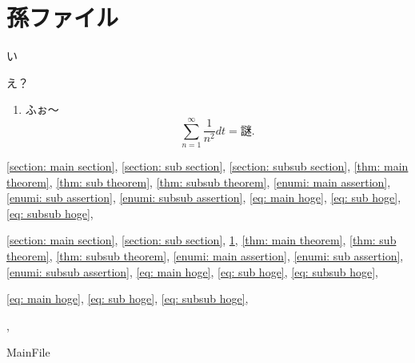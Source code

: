 \documentclass[uplatex,dvipdfmx]{jsarticle}
\begin{document}
\fi\fi

\section{孫ファイル}\label{section: subsub section}
い
\begin{thm}\label{thm: subsub theorem}
  え？
  \begin{enumerate}
    \item \label{enumi: subsub assertion}
    ふぉ〜
    \begin{equation}
      \label{eq: subsub hoge}
      \sum_{n=1}^{\infty}\frac{1}{n^2}dt = \text{謎}.
      \tag{\(\spadesuit\)}
    \end{equation}
  \end{enumerate}
\end{thm}

\autoref{section: main section},
\autoref{section: sub section},
\autoref{section: subsub section},
\autoref{thm: main theorem},
\autoref{thm: sub theorem},
\autoref{thm: subsub theorem},
\autoref{enumi: main assertion},
\autoref{enumi: sub assertion},
\autoref{enumi: subsub assertion},
\autoref{eq: main hoge},
\autoref{eq: sub hoge},
\autoref{eq: subsub hoge},

\ref{section: main section},
\ref{section: sub section},
\ref{section: subsub section},
\ref{thm: main theorem},
\ref{thm: sub theorem},
\ref{thm: subsub theorem},
\ref{enumi: main assertion},
\ref{enumi: sub assertion},
\ref{enumi: subsub assertion},
\ref{eq: main hoge},
\ref{eq: sub hoge},
\ref{eq: subsub hoge},

\eqref{eq: main hoge},
\eqref{eq: sub hoge},
\eqref{eq: subsub hoge},

\cite{kashiwara2002sheaves},

\ifcsname MainFile\endcsname\else
\printbibliography
\end{document}
